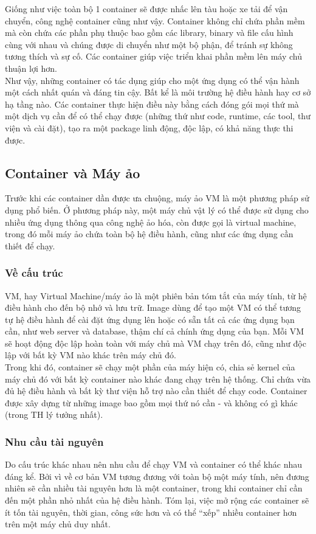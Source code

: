\documentclass[12pt,a4paper]{report}
\begin{document}
		Giống như việc toàn bộ 1 container sẽ được nhấc lên tàu hoặc xe tải để vận chuyển, công nghệ container cũng như vậy. Container không chỉ chứa phần mềm mà còn chứa các phần phụ thuộc bao gồm các library, binary và file cấu hình cùng với nhau và chúng được di chuyển như một bộ phận, để tránh sự không tương thích và sự cố. Các container giúp việc triển khai phần mềm lên máy chủ thuận lợi hơn.\\
		
		Như vậy, những container có tác dụng giúp cho một ứng dụng có thể vận hành một cách nhất quán và đáng tin cậy. Bất kể là môi trường hệ điều hành hay cơ sở hạ tầng nào. Các container thực hiện điều này bằng cách đóng gói mọi thứ mà một dịch vụ cần để có thể chạy được (những thứ như code, runtime, các tool, thư viện và cài đặt), tạo ra một package linh động, độc lập, có khả năng thực thi được.
		\subsection{Container và Máy ảo}
		\hspace{0.6cm}Trước khi các container dần được ưa chuộng, máy ảo VM là một phương pháp sử dụng phổ biến. Ở phương pháp này, một máy chủ vật lý có thể được sử dụng cho nhiều ứng dụng thông qua công nghệ ảo hóa, còn được gọi là virtual machine, trong đó mỗi máy ảo chứa toàn bộ hệ điều hành, cũng như các ứng dụng cần thiết để chạy.
		\subsubsection{Về cấu trúc}
		\hspace{0.6cm}VM, hay Virtual Machine/máy ảo là một phiên bản tóm tắt của máy tính, từ hệ điều hành cho đến bộ nhớ và lưu trữ. Image dùng để tạo một VM có thể tương tự hệ điều hành để cài đặt ứng dụng lên hoặc có sẵn tất cả các ứng dụng bạn cần, như web server và database, thậm chí cả chính ứng dụng của bạn. Mỗi VM sẽ hoạt động độc lập hoàn toàn với máy chủ mà VM chạy trên đó, cũng như độc lập với bất kỳ VM nào khác trên máy chủ đó.\\

		Trong khi đó, container sẽ chạy một phần của máy hiện có, chia sẻ kernel của máy chủ đó với bất kỳ container nào khác đang chạy trên hệ thống. Chỉ chứa vừa đủ hệ điều hành và bất kỳ thư viện hỗ trợ nào cần thiết để chạy code. Container được xây dựng từ những image bao gồm mọi thứ nó cần - và không có gì khác (trong TH lý tưởng nhất).
		\subsubsection{Nhu cầu tài nguyên}
		\hspace{0.6cm}Do cấu trúc khác nhau nên nhu cầu để chạy VM và container có thể khác nhau đáng kể. Bởi vì về cơ bản VM tương đương với toàn bộ một máy tính, nên đương nhiên sẽ cần nhiều tài nguyên hơn là một container, trong khi container chỉ cần đến một phần nhỏ nhất của hệ điều hành. Tóm lại, việc mở rộng các container sẽ ít tốn tài nguyên, thời gian, công sức hơn và có thể “xếp” nhiều container hơn trên một máy chủ duy nhất.\\
		
\end{document}
